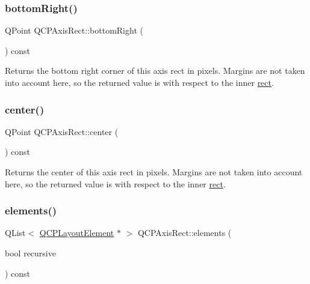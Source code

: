\subsubsection{\texorpdfstring{bottom\+Right()}{bottomRight()}}
{\footnotesize\ttfamily Q\+Point Q\+C\+P\+Axis\+Rect\+::bottom\+Right (\begin{DoxyParamCaption}{ }\end{DoxyParamCaption}) const\hspace{0.3cm}{\ttfamily [inline]}}

Returns the bottom right corner of this axis rect in pixels. Margins are not taken into account here, so the returned value is with respect to the inner \mbox{\hyperlink{class_q_c_p_layout_element_a208effccfe2cca4a0eaf9393e60f2dd4}{rect}}. \mbox{\label{class_q_c_p_axis_rect_ade3aef874bafcec6dd16174fba44c0b1}} 
\subsubsection{\texorpdfstring{center()}{center()}}
{\footnotesize\ttfamily Q\+Point Q\+C\+P\+Axis\+Rect\+::center (\begin{DoxyParamCaption}{ }\end{DoxyParamCaption}) const\hspace{0.3cm}{\ttfamily [inline]}}

Returns the center of this axis rect in pixels. Margins are not taken into account here, so the returned value is with respect to the inner \mbox{\hyperlink{class_q_c_p_layout_element_a208effccfe2cca4a0eaf9393e60f2dd4}{rect}}. \mbox{\label{class_q_c_p_axis_rect_a3aee067fd105f2fa8de9eb8024435ac5}} 
\subsubsection{\texorpdfstring{elements()}{elements()}}
{\footnotesize\ttfamily Q\+List$<$ \mbox{\hyperlink{class_q_c_p_layout_element}{Q\+C\+P\+Layout\+Element}} $\ast$ $>$ Q\+C\+P\+Axis\+Rect\+::elements (\begin{DoxyParamCaption}\item[{bool}]{recursive }\end{DoxyParamCaption}) const\hspace{0.3cm}{\ttfamily [virtual]}}

